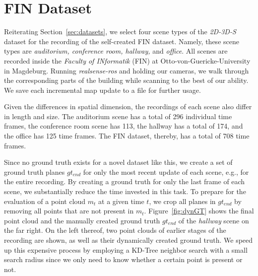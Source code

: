 \documentclass[main.tex]{subfiles}
\begin{document}
\section{FIN Dataset}
\label{sec:finimpl}
Reiterating Section~\ref{sec:datasets}, we select four scene types of the \textit{2D-3D-S} dataset for the recording of the self-created FIN
dataset. Namely, these scene types are \textit{auditorium, conference room, hallway,} and \textit{office}.
All scenes are recorded inside the \textit{Faculty of INformatik} (FIN) at Otto-von-Guericke-University in Magdeburg.
Running \textit{realsense-ros} and holding our cameras, we walk through the corresponding parts of the building while scanning to the best of our ability.
We save each incremental map update to a file for further usage.

Given the differences in spatial dimension, the recordings of each scene also differ in length and size.
The auditorium scene has a total of 296 individual time frames, the conference room scene has 113, the hallway has a total of 174, 
and the office has 125 time frames.
The FIN dataset, thereby, has a total of 708 time frames.

Since no ground truth exists for a novel dataset like this, we create a set of ground truth planes $gt_{end}$ for only the most recent update of each scene, e.g., for the entire recording.
By creating a ground truth for only the last frame of each scene, we substantially reduce the time invested in this task.
To prepare for the evaluation of a point cloud $m_t$ at a given time $t$, we crop all planes in $gt_{end}$ by removing all points that are not present in $m_t$.
Figure~\ref{fig:dynGT} shows the final point cloud and the manually created ground truth $gt_{end}$ of the \textit{hallway} scene on the far right. 
On the left thereof, two point clouds of earlier stages of the recording are shown, as well as their dynamically created ground truth. 
We speed up this expensive process by employing a KD-Tree neighbor search with a small search radius since we only need to know whether a certain point is present or not.
\end{document}
